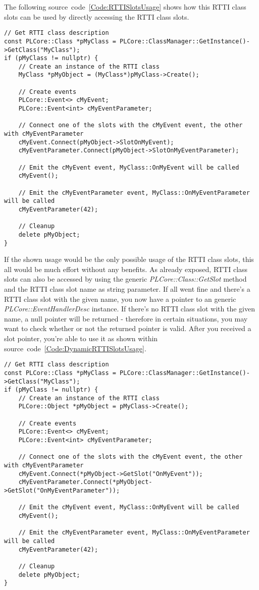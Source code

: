 The following source~code~\ref{Code:RTTISlotsUsage} shows how this \ac{RTTI} class slots can be used by directly accessing the \ac{RTTI} class slots.
\begin{lstlisting}[label=Code:RTTISlotsUsage,caption={\ac{RTTI} class slots usage}]
// Get RTTI class description
const PLCore::Class *pMyClass = PLCore::ClassManager::GetInstance()->GetClass("MyClass");
if (pMyClass != nullptr) {
	// Create an instance of the RTTI class
	MyClass *pMyObject = (MyClass*)pMyClass->Create();

	// Create events
	PLCore::Event<> cMyEvent;
	PLCore::Event<int> cMyEventParameter;

	// Connect one of the slots with the cMyEvent event, the other with cMyEventParameter
	cMyEvent.Connect(pMyObject->SlotOnMyEvent);
	cMyEventParameter.Connect(pMyObject->SlotOnMyEventParameter);

	// Emit the cMyEvent event, MyClass::OnMyEvent will be called
	cMyEvent();

	// Emit the cMyEventParameter event, MyClass::OnMyEventParameter will be called
	cMyEventParameter(42);

	// Cleanup
	delete pMyObject;
}
\end{lstlisting}
If the shown usage would be the only possible usage of the \ac{RTTI} class slots, this all would be much effort without any benefits. As already exposed, \ac{RTTI} class slots can also be accessed by using the generic \emph{PLCore::Class::GetSlot} method and the \ac{RTTI} class slot name as string parameter. If all went fine and there's a \ac{RTTI} class slot with the given name, you now have a pointer to an generic \emph{PLCore::EventHandlerDesc} instance. If there's no \ac{RTTI} class slot with the given name, a null pointer will be returned - therefore in certain situations, you may want to check whether or not the returned pointer is valid. After you received a slot pointer, you're able to use it as shown within source~code~\ref{Code:DynamicRTTISlotsUsage}.
\begin{lstlisting}[label=Code:DynamicRTTISlotsUsage,caption={Dynamic \ac{RTTI} class slots usage}]
// Get RTTI class description
const PLCore::Class *pMyClass = PLCore::ClassManager::GetInstance()->GetClass("MyClass");
if (pMyClass != nullptr) {
	// Create an instance of the RTTI class
	PLCore::Object *pMyObject = pMyClass->Create();

	// Create events
	PLCore::Event<> cMyEvent;
	PLCore::Event<int> cMyEventParameter;

	// Connect one of the slots with the cMyEvent event, the other with cMyEventParameter
	cMyEvent.Connect(*pMyObject->GetSlot("OnMyEvent"));
	cMyEventParameter.Connect(*pMyObject->GetSlot("OnMyEventParameter"));

	// Emit the cMyEvent event, MyClass::OnMyEvent will be called
	cMyEvent();

	// Emit the cMyEventParameter event, MyClass::OnMyEventParameter will be called
	cMyEventParameter(42);

	// Cleanup
	delete pMyObject;
}
\end{lstlisting}

